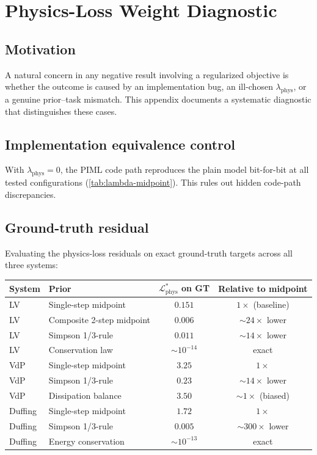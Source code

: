 \documentclass[11pt]{article}
\begin{document}
\section{Physics-Loss Weight Diagnostic}
\label{app:lambda-diagnostic}

\subsection{Motivation}

A natural concern in any negative result involving a regularized objective is whether the outcome is caused by an implementation bug, an ill-chosen $\lambda_{\mathrm{phys}}$, or a genuine prior--task mismatch.
This appendix documents a systematic diagnostic that distinguishes these cases.

\subsection{Implementation equivalence control}

With $\lambda_{\mathrm{phys}} = 0$, the PIML code path reproduces the plain model bit-for-bit at all tested configurations (\cref{tab:lambda-midpoint}).
This rules out hidden code-path discrepancies.

\subsection{Ground-truth residual}

Evaluating the physics-loss residuals on exact ground-truth targets across all three systems:

\begin{center}
\begin{tabular}{llcc}
\toprule
System & Prior & $\mathcal{L}_{\mathrm{phys}}^*$ on GT & Relative to midpoint \\
\midrule
LV & Single-step midpoint & $0.151$ & $1\times$ (baseline) \\
LV & Composite 2-step midpoint & $0.006$ & $\sim\!24\times$ lower \\
LV & Simpson 1/3-rule & $0.011$ & $\sim\!14\times$ lower \\
LV & Conservation law & $\sim\!10^{-14}$ & exact \\
\midrule
VdP & Single-step midpoint & $3.25$ & $1\times$ \\
VdP & Simpson 1/3-rule & $0.23$ & $\sim\!14\times$ lower \\
VdP & Dissipation balance & $3.50$ & $\sim\!1\times$ (biased) \\
\midrule
Duffing & Single-step midpoint & $1.72$ & $1\times$ \\
Duffing & Simpson 1/3-rule & $0.005$ & $\sim\!300\times$ lower \\
Duffing & Energy conservation & $\sim\!10^{-13}$ & exact \\
\bottomrule
\end{tabular}
\end{center}
\end{document}
